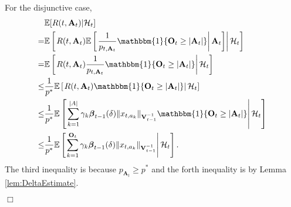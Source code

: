 \documentclass{article}
\newcommand{\bbeta}{\boldsymbol{\beta}}
\newcommand{\EE}{\mathbb{E}}
\newcommand{\bOne}{\mathbbm{1}}
\newcommand{\bA}{\mathbf{A}}
\newcommand{\bO}{\mathbf{O}}
\newcommand{\bV}{\mathbf{V}}
\newcommand{\cH}{\mathcal{H}}
\newcommand{\abs}[1]{\left| #1 \right|}
\newcommand{\norm}[1]{\| #1 \|}
\newenvironment{proof}{\noindent {\textbf{Proof. }}}{$\Box$ \medskip}
\begin{document}
\begin{proof}
For the disjunctive case,  
\begin{align*}
&\EE[R(t, \bA_t)|\cH_t] \\
=& \EE \left[ \left. R(t, \bA_t) \EE \left[ \left. \frac{1}{p_{t, \bA_t}} \bOne\{\bO_t\geq\abs{\bA_t}\} \right| \bA_t \right]  \right| \cH_t \right]\\
=& \EE \left[ \left. R(t, \bA_t) \frac{1}{p_{t, \bA_t}} \bOne\{\bO_t\geq\abs{\bA_t}\}  \right| \cH_t \right]\\
\leq &\frac{1}{p^{\ast}} \EE \left[ \left. R(t, \bA_t) \bOne\{\bO_t\geq\abs{\bA_t}\}  \right| \cH_t \right]\\
\leq &\frac{1}{p^{\ast}} \EE \left[ \left. \sum_{k=1}^{\abs{A}} \gamma_k \bbeta_{t-1}(\delta)\norm{x_{t,a_k}}_{\bV_{t-1}^{-1}} \bOne\{\bO_t\geq\abs{\bA_t}\}  \right| \cH_t \right]\\
\leq &\frac{1}{p^{\ast}} \EE \left[ \left. \sum_{k=1}^{\bO_t} \gamma_k \bbeta_{t-1}(\delta)\norm{x_{t,a_k}}_{\bV_{t-1}^{-1}} \right| \cH_t \right].
\end{align*}
The third inequality is because $p_{\bA_t} \geq p^*$ and the forth inequality is by Lemma \ref{lem:DeltaEstimate}.


\end{proof}
\end{document}

